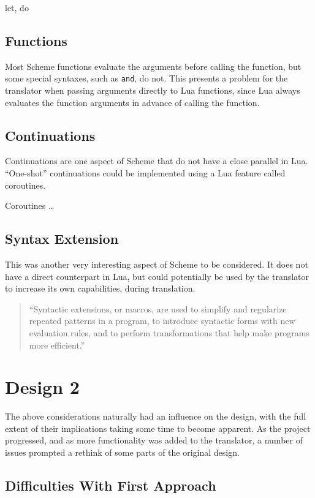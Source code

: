 let, do

\subsection{Functions}

Most Scheme functions evaluate the arguments before calling the function, but
some special syntaxes, such as \texttt{and}, do not. This presents a problem
for the translator when passing arguments directly to Lua functions, since Lua
always evaluates the function arguments in advance of calling the function.


\subsection{Continuations}

Continuations are one aspect of Scheme that do not have a close parallel in
Lua. ``One-shot'' continuations could be implemented using a Lua feature called
coroutines.

Coroutines \ldots

\subsection{Syntax Extension}

This was another very interesting aspect of Scheme to be considered. It does not
have a direct counterpart in Lua, but could potentially be used by the
translator to increase its own capabilities, during translation.

\begin{quotation}
``Syntactic extensions, or macros, are used to simplify and regularize repeated
patterns in a program, to introduce syntactic forms with new evaluation rules,
and to perform transformations that help make programs more
efficient.''~\cite[Ch~8]{tspl}
\end{quotation}


\section{Design 2}

The above considerations naturally had an influence on the design, with the full
extent of their implications taking some time to become apparent. As the
project progressed, and as more functionality was added to the translator, a
number of issues prompted a rethink of some parts of the original design.

\subsection{Difficulties With First Approach}

